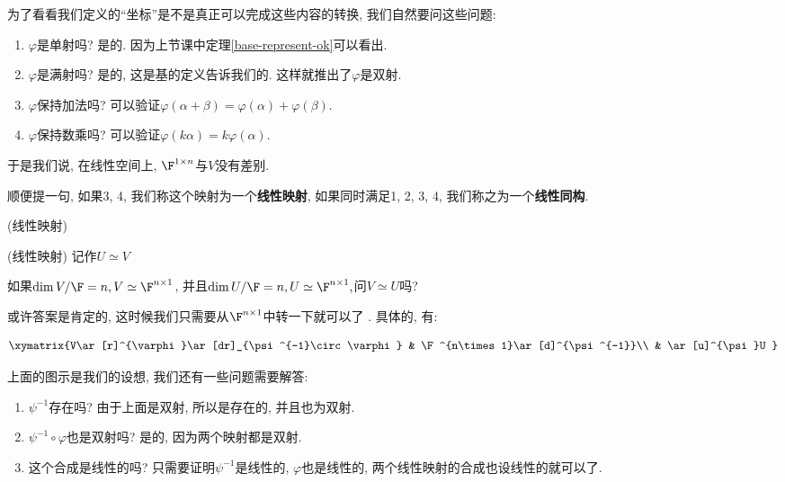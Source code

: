 为了看看我们定义的``坐标''是不是真正可以完成这些内容的转换, 我们自然要问这些问题:
\begin{enumerate}
\item $\varphi$是单射吗? 是的. 因为上节课中定理\ref{base-represent-ok}可以看出. 
\item $\varphi$是满射吗? 是的, 这是基的定义告诉我们的. 这样就推出了$\varphi$是双射. 
\item $\varphi$保持加法吗? 可以验证$\varphi(\alpha+\beta)=\varphi(\alpha)+\varphi(\beta)$.
\item $\varphi$保持数乘吗? 可以验证$\varphi(k\alpha)=k\varphi(\alpha)$.
\end{enumerate}
于是我们说, 在线性空间上, $\F^{1\times n}$与$V$没有差别. 

顺便提一句, 如果3, 4, 我们称这个映射为一个\textbf{线性映射}, 如果同时满足1, 2, 3, 4, 我们称之为一个\textbf{线性同构}. 
\begin{defn}
(线性映射)
\end{defn}
%
\begin{defn}
(线性映射) 记作$U\simeq V$
\end{defn}
\begin{problem}
如果$\dim V/\F=n,V\simeq\F^{n\times1}$, 并且$\dim U/\F=n,U\simeq\F^{n\times1},$问$V\simeq U$吗?
\end{problem}
或许答案是肯定的, 这时候我们只需要从$\F^{n\times1}$中转一下就可以了 . 具体的, 有:

\[
\xymatrix{V\ar[r]^{\varphi}\ar[dr]_{\psi^{-1}\circ\varphi} & \F^{n\times1}\ar[d]^{\psi^{-1}}\\
 & \ar[u]^{\psi}U
}
\]

上面的图示是我们的设想, 我们还有一些问题需要解答: 
\begin{enumerate}
\item $\psi^{-1}$存在吗? 由于上面是双射, 所以是存在的, 并且也为双射.
\item $\psi^{-1}\circ\varphi$也是双射吗? 是的, 因为两个映射都是双射.
\item 这个合成是线性的吗? 只需要证明$\psi^{-1}$是线性的, $\varphi$也是线性的, 两个线性映射的合成也设线性的就可以了. 
\end{enumerate}
\noindent{}


